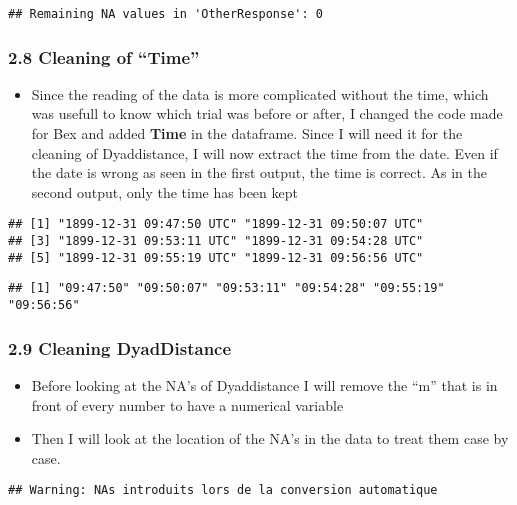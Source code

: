 \documentclass[
]{article}
\providecommand{\tightlist}{%
  \setlength{\itemsep}{0pt}\setlength{\parskip}{0pt}}
\begin{document}
\begin{verbatim}
## Remaining NA values in 'OtherResponse': 0
\end{verbatim}

\hypertarget{cleaning-of-time}{%
\subsubsection{2.8 Cleaning of ``Time''}\label{cleaning-of-time}}

\begin{itemize}
\tightlist
\item
  Since the reading of the data is more complicated without the time,
  which was usefull to know which trial was before or after, I changed
  the code made for Bex and added \textbf{Time} in the dataframe. Since
  I will need it for the cleaning of Dyaddistance, I will now extract
  the time from the date. Even if the date is wrong as seen in the first
  output, the time is correct. As in the second output, only the time
  has been kept
\end{itemize}

\begin{verbatim}
## [1] "1899-12-31 09:47:50 UTC" "1899-12-31 09:50:07 UTC"
## [3] "1899-12-31 09:53:11 UTC" "1899-12-31 09:54:28 UTC"
## [5] "1899-12-31 09:55:19 UTC" "1899-12-31 09:56:56 UTC"
\end{verbatim}

\begin{verbatim}
## [1] "09:47:50" "09:50:07" "09:53:11" "09:54:28" "09:55:19" "09:56:56"
\end{verbatim}

\hypertarget{cleaning-dyaddistance}{%
\subsubsection{2.9 Cleaning DyadDistance}\label{cleaning-dyaddistance}}

\begin{itemize}
\tightlist
\item
  Before looking at the NA's of Dyaddistance I will remove the ``m''
  that is in front of every number to have a numerical variable
\item
  Then I will look at the location of the NA's in the data to treat them
  case by case.
\end{itemize}

\begin{verbatim}
## Warning: NAs introduits lors de la conversion automatique
\end{verbatim}
\end{document}
